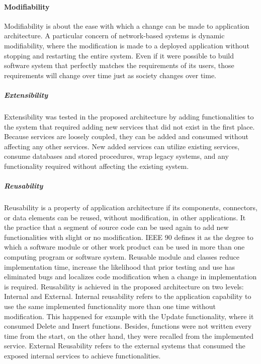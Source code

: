 \documentclass[12pt,a4paper,final,twoside,onecolumn,titlepage]{book}
\begin{document}
\paragraph{Modifiability}
Modifiability is about the ease with which a change can be made to application architecture. A particular concern of network-based systems is dynamic modifiability, where the modification is made to a deployed application without stopping and restarting the entire system. Even if it were possible to build software system that perfectly matches the requirements of its users, those requirements will change over time just as society changes over time.
\subparagraph{Extensibility}
Extensibility was tested in the proposed architecture by adding functionalities to the system that required adding new services that did not exist in the first place. Because services are loosely coupled, they can be added and consumed without affecting any other services. New added services can utilize existing services, consume databases and stored procedures, wrap legacy systems, and any functionality required without affecting the existing system.
\subparagraph{Reusability}
Reusability is a property of application architecture if its components, connectors, or data elements can be reused, without modification, in other applications. It the practice that a segment of source code can be used again to add new functionalities with slight or no modification. IEEE 90 defines it as the degree to which a software module or other work product can be used in more than one computing program or software system. Reusable module and classes reduce implementation time, increase the likelihood that prior testing and use has eliminated bugs and localizes code modification when a change in implementation is required.
Reusability is achieved in the proposed architecture on two levels: Internal and External. Internal reusability refers to the application capability to use the same implemented functionality more than one time without modification. This happened for example with the Update functionality, where it consumed Delete and Insert functions. Besides, functions were not written every time from the start, on the other hand, they were recalled from the implemented service. External Reusability refers to the external systems that consumed the exposed internal services to achieve functionalities.
\end{document}
